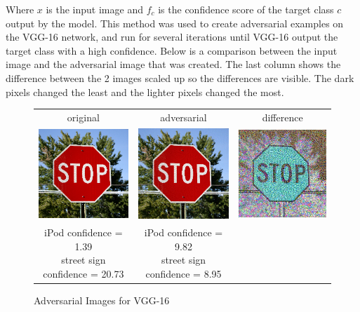 \documentclass{article}
\begin{document}
Where $x$ is the input image and $f_c$ is the confidence score of the target class $c$ output by the model. This method was used to create adversarial examples on the VGG-16 \cite{simonyan2015deep} network, and run for several iterations until VGG-16 output the target class with a high confidence. Below is a comparison between the input image and the adversarial image that was created. The last column shows the difference between the 2 images scaled up so the differences are visible. The dark pixels changed the least and the lighter pixels changed the most.

\begin{figure}[h]
\centering
\begin{tabular}{ c c c }
    original & adversarial & difference \\
    \includegraphics[width=0.3\linewidth]{../test_images/stop.png} & \includegraphics[width=0.3\linewidth]{../test_images/adversarial_vgg/stop.png} & \includegraphics[width=0.3\linewidth]{../test_images/adversarial_vgg/stop_diff.png} \\
    \makecell{iPod confidence = 1.39 \\street sign confidence = 20.73} & \makecell{iPod confidence = 9.82 \\street sign confidence = 8.95} & \\
\end{tabular}
\caption{Adversarial Images for VGG-16}
\label{fig:vggadversarial}
\end{figure}
\end{document}
